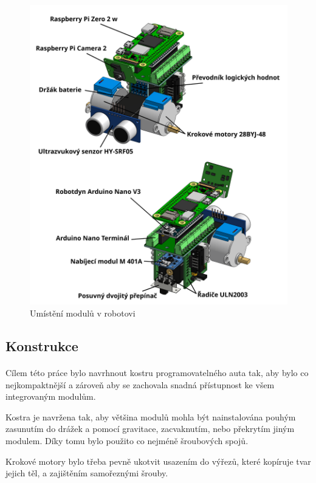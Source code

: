\documentclass[12pt]{article}
\begin{document}
\begin{spacing}{1.5}
	\begin{figure}[H]
		\centering
		\includegraphics[width=\linewidth]{moduly}
		\caption{Umístění modulů v robotovi}
		\label{fig:moduly}
	\end{figure}
	\newpage	
	\subsection{Konstrukce}
	\paragraph{} Cílem této práce bylo navrhnout kostru programovatelného auta tak, aby bylo co nejkompaktnější a zároveň aby se zachovala snadná přístupnost ke všem integrovaným modulům.
	
	Kostra je navržena tak, aby většina modulů mohla být nainstalována pouhým zasunutím do drážek a pomocí gravitace, zacvaknutím, nebo překrytím jiným modulem. Díky tomu bylo použito co nejméně šroubových spojů.
	
	Krokové motory bylo třeba pevně ukotvit usazením do výřezů, které kopíruje tvar jejich těl, a zajištěním samořeznými šrouby.
	

\end{spacing}
\end{document}
